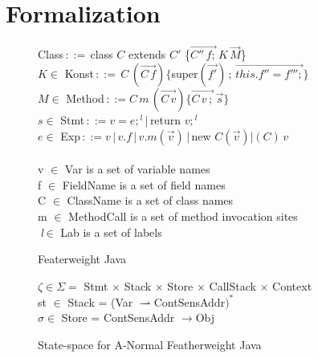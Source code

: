 \section{Formalization}
\begin{figure}
\begin{center}
Class$\,::=\,$class $C$ extends $C'$ \{$\overrightarrow{C''\, f;} \, K \, \overrightarrow{M}$\}\,\\
$K \in$ Konst$\,::=\,C\,(\overrightarrow{C\,f})\{$super$(\overrightarrow{f'})\, ; \, \overrightarrow{this.f'' = f''';}\}$\\
$M \in $ Method$\,::=C \, m \, (\overrightarrow{C \, v})
\{\overrightarrow{C \, v \, ;} \, \overrightarrow{s}\}$\\


$s \in $ Stmt$\,::= v = {e;}^{\textit{l}}\,|\,$return ${v;}^{\textit{l}}$\\


$e \in $ Exp$\,::= v \, | \, v.f \, | \, v.m(\overrightarrow{v}) \, |
\, $new $C(\overrightarrow{v})|(C) \, v$\\~\\


v $\in$ Var is a set of variable names\\
f $\in$ FieldName is a set of field names\\
C $\in$ ClassName is a set of class names\\
m $\in$ MethodCall is a set of method invocation sites\\
$\textit{l} \, \in$ Lab is a set of labels\\
\end{center}
\caption{Featerweight Java}
\end{figure}

\begin{figure}
\begin{center}

$\zeta \in \Sigma =$ Stmt $\times$ Stack $\times$ Store $\times$
CallStack $\times$ Context\\
st $\in$ Stack = (Var $\rightharpoonup$ContSensAddr$)^*$\\
$\sigma \in$ Store = ContSensAddr $\rightarrow$Obj\\
\end{center}
\caption{State-space for A-Normal Featherweight Java}
\end{figure}
